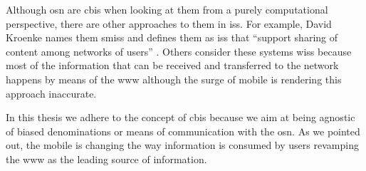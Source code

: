 \documentclass[showtrims, oldfontcommands]{kthesis}
\begin{document}
Although \ac{osn} are \ac{cbis} when looking at them from a purely computational 
perspective, there are other approaches to them in \acp{is}. For example, David 
Kroenke names them \acp{smis} and defines them as \acp{is} that ``support sharing 
of content among networks of users'' \cite{Kroenke15}. Others consider these systems 
\acp{wis} because most of the information that can be received and transferred to 
the network happens by means of the \ac{www} although the surge of mobile \Internet 
is rendering this approach inaccurate.

In this thesis we adhere to the concept of \ac{cbis} because we aim at being agnostic 
of biased denominations or means of communication with the \ac{osn}. As we pointed 
out, the mobile \Internet is changing the way information is consumed by users revamping 
the \ac{www} as the leading source of information.




%
%


\end{document}
